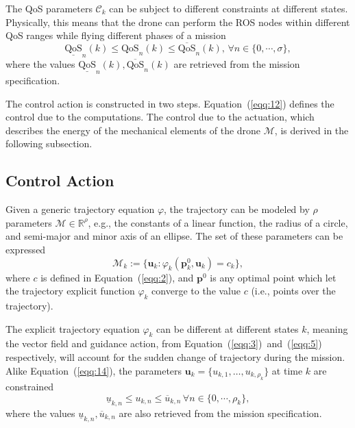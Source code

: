 \documentclass[letterpaper,10pt,conference]{ieeeconf}
\begin{document}
The QoS parameters $\mathcal{C}_k$ can be subject to different constraints at different states. Physically, this means that the drone can perform the ROS nodes within different QoS ranges while flying different phases of a mission
\begin{equation}\label{eqq:14}
  \underline{\text{QoS}}_n(k)\leq \text{QoS}_n(k)\leq \overline{\text{QoS}}_n(k),\,\forall n\in\{0,\cdots,\sigma\},
\end{equation}
where the values $\underline{\text{QoS}}_n(k),\overline{\text{QoS}}_n(k)$ are retrieved from the mission specification.

The control action is constructed in two steps. Equation~(\ref{eqq:12}) defines the control due to the computations. The control due to the actuation, which describes the energy of the mechanical elements of the drone $\mathcal{M}$, is derived in the following subsection.

\subsection{Control Action}

Given a generic trajectory equation $\varphi$, the trajectory can be modeled by $\rho$ parameters $\mathcal{M}\in\mathbb{R}^\rho$, e.g., the constants of a linear function, the radius of a circle, and semi-major and minor axis of an ellipse. The set of these parameters can be expressed
\begin{equation}\label{eqq:14}
  \mathcal{M}_k:=\{\mathbf{u}_k : \varphi_k(\mathbf{p}_k^0,\mathbf{u}_k)=c_k\},
\end{equation}
where $c$ is defined in Equation~(\ref{eqq:2}), and $\mathbf{p}^0$ is any optimal point which let the trajectory explicit function $\varphi_k$ converge to the value $c$ (i.e., points over the trajectory). 

The explicit trajectory equation $\varphi_k$ can be different at different states $k$, meaning the vector field and guidance action, from Equation~(\ref{eqq:3})~and~(\ref{eqq:5}) respectively, will account for the sudden change of trajectory during the mission. Alike Equation~(\ref{eqq:14}), the parameters $\mathbf{u}_k=\{u_{k,1},\dots,u_{k,\rho_k}\}$ at time $k$ are constrained
\begin{equation}
  \underline{u}_{k,n}\leq u_{k,n}\leq \overline{u}_{k,n}\,\forall n\in\{0,\cdots,\rho_k\},
\end{equation}
where the values $\underline{u}_{k,n},\overline{u}_{k,n}$ are also retrieved from the mission specification.
\end{document}
